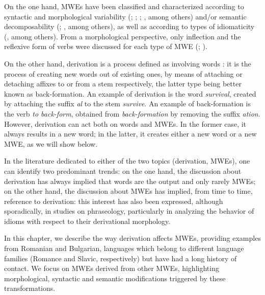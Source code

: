 \documentclass[output=paper]{langsci/langscibook}
\begin{document}
On the one hand, MWEs have been classified and characterized according
to syntactic  and morphological variability  (\citealt{Nunberg1994}; \citealt{Sag:2002}; \citealt{baldwin2003}; \citealt{Baldwin2010}, among others)
and/or semantic decomposability (\citealt{Nunberg1994}; \citealt{baldwin2003}, among others), as well as according to types of idiomaticity
(\citealt{baldwin2004, baldwin2006}, among others). From a morphological perspective,
only inflection and the reflexive form of verbs were discussed for each
type of MWE (\citealt{Sag:2002}; \citealt{Savary:2008}).

On the other hand, derivation is a process defined as involving words \linebreak
\citep{marouzeau1933}: it is the process of creating new words out of
existing ones, by means of attaching or detaching affixes to or
from a stem respectively, the latter type being better known as
back-formation. An example of derivation is the word \textit{survival}, created
by attaching the suffix \textit{\textendash al} to the stem \textit{survive}. An example of
back-formation is the verb \textit{to back-form}, obtained from
\textit{back-formation} by removing the suffix \textit{\textendash ation}. However, derivation
can act both on words and MWEs. In the former case, it always results
in a new word; in the latter, it creates either a new word or a new
MWE, as we will show below.

 
 
In the literature dedicated to either of the two topics (derivation,
MWEs), one can identify two predominant trends: on the one hand, the
discussion about derivation has always implied that words are the output and only rarely
MWEs; on the other hand, the discussion about MWEs has implied, from
time to time, reference to derivation: this interest has also been
expressed, although sporadically, in studies on phraseology,
particularly in analyzing the behavior of idioms with respect to their
derivational morphology. 



In this chapter, we describe the way derivation affects MWEs, providing
examples from Romanian and Bulgarian, languages which belong to different language families (Romance and Slavic, respectively) but have had a long history of contact. We focus on MWEs derived from other MWEs,
highlighting morphological, syntactic and semantic modifications
triggered by these transformations.
\end{document}
